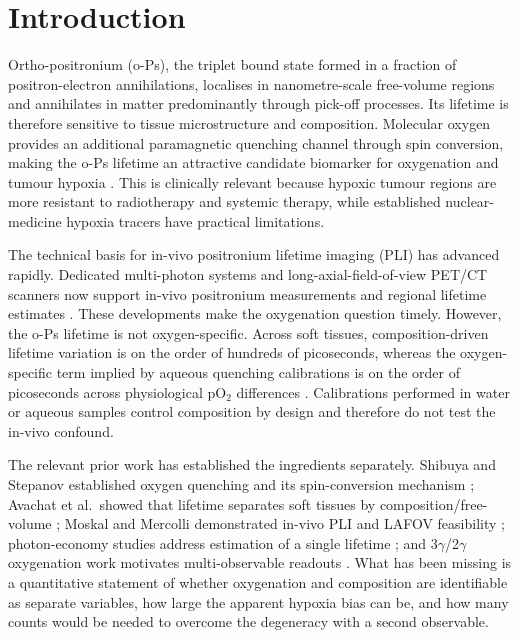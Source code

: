 \documentclass[pdflatex,sn-mathphys-num]{sn-jnl}
\begin{document}

\maketitle

\section{Introduction}\label{introduction}

Ortho-positronium (o-Ps), the triplet bound state formed in a fraction of positron-electron annihilations, localises in nanometre-scale free-volume regions and annihilates in matter predominantly through pick-off processes. Its lifetime is therefore sensitive to tissue microstructure and composition. Molecular oxygen provides an additional paramagnetic quenching channel through spin conversion, making the o-Ps lifetime an attractive candidate biomarker for oxygenation and tumour hypoxia \cite{ref1,ref2}. This is clinically relevant because hypoxic tumour regions are more resistant to radiotherapy and systemic therapy, while established nuclear-medicine hypoxia tracers have practical limitations.

The technical basis for in-vivo positronium lifetime imaging (PLI) has advanced rapidly. Dedicated multi-photon systems and long-axial-field-of-view PET/CT scanners now support in-vivo positronium measurements and regional lifetime estimates \cite{ref3,ref4,ref5,ref6}. These developments make the oxygenation question timely. However, the o-Ps lifetime is not oxygen-specific. Across soft tissues, composition-driven lifetime variation is on the order of hundreds of picoseconds, whereas the oxygen-specific term implied by aqueous quenching calibrations is on the order of picoseconds across physiological pO\(_2\) differences \cite{ref1,ref7}. Calibrations performed in water or aqueous samples control composition by design and therefore do not test the in-vivo confound.

The relevant prior work has established the ingredients separately. Shibuya and Stepanov established oxygen quenching and its spin-conversion mechanism \cite{ref1,ref2}; Avachat et al.~showed that lifetime separates soft tissues by composition/free-volume \cite{ref7}; Moskal and Mercolli demonstrated in-vivo PLI and LAFOV feasibility \cite{ref3,ref4,ref5,ref6}; photon-economy studies address estimation of a single lifetime \cite{ref8,ref9}; and 3\(\gamma\)/2\(\gamma\) oxygenation work motivates multi-observable readouts \cite{ref10,ref11,ref12}. What has been missing is a quantitative statement of whether oxygenation and composition are identifiable as separate variables, how large the apparent hypoxia bias can be, and how many counts would be needed to overcome the degeneracy with a second observable.
\end{document}
